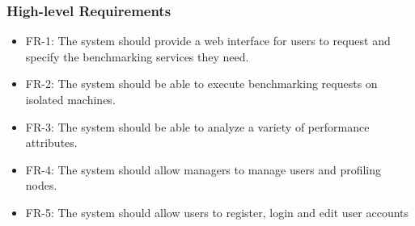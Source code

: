 \documentclass{article}
\begin{document}
    \subsubsection{High-level Requirements}
    	\begin{itemize}
        		\item FR-1: The system should provide a web interface for users to request and specify the benchmarking services they need.
                \item FR-2: The system should be able to execute benchmarking requests on isolated machines.
                \item FR-3: The system should be able to analyze a variety of performance attributes. 
                \item FR-4: The system should allow managers to manage users and profiling nodes. 
                \item FR-5: The system should allow users to register, login and edit user accounts  
        \end{itemize}
            
\end{document}
